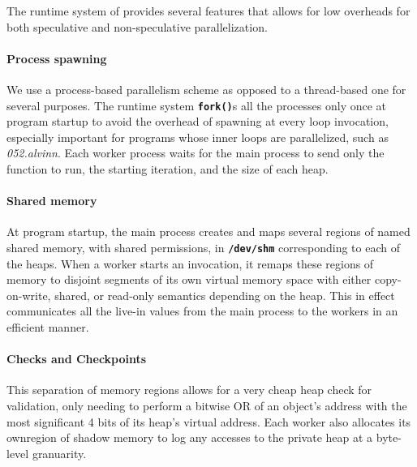 The runtime system of \name provides several features that allows for
low overheads for both speculative and non-speculative parallelization.

\paragraph{Process spawning}
We use a process-based parallelism scheme as opposed to a thread-based one
for several purposes. The runtime system \texttt{\textbf{fork()}}s all the processes
only once at program startup to avoid the overhead of spawning at every loop
invocation, especially important for programs whose inner loops are
parallelized, such as \textit{052.alvinn}. Each worker process waits for the main
process to send only the function to run, the starting iteration, and the
size of each heap.

\paragraph{Shared memory}
At program startup, the main process creates and maps several regions of named shared
memory, with shared permissions, in \texttt{\textbf{/dev/shm}} corresponding
to each of the heaps.
When a worker starts an invocation, it remaps these regions of memory to
disjoint segments of its own virtual memory space with either
copy-on-write, shared, or read-only semantics depending on the heap.
This in effect communicates all the live-in values from the
main process to the workers in an efficient manner.

\paragraph{Checks and Checkpoints}


This separation of memory regions
allows for a very cheap heap check for validation, only needing to perform a bitwise OR
of an object's address with the most significant 4 bits of its heap's virtual address.
Each worker also allocates its ownregion of shadow memory to log any accesses to
the private heap at a byte-level granuarity.

